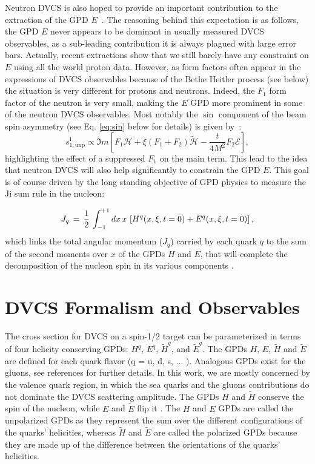 Neutron DVCS is also hoped to provide an important contribution to the 
extraction of the GPD $E$~\cite{dHose:2016mda}. The reasoning behind this expectation is as 
follows, the GPD $E$ never appears to be dominant in usually measured DVCS 
observables, as a sub-leading contribution it is always plagued with large 
error bars. Actually, recent extractions \cite{Dupre:2017hfs,Moutarde:2018kwr} show 
that we still barely have any constraint on $E$ using all the world proton 
data.  However, as form factors often appear in the expressions of
DVCS observables because of the Bethe Heitler process (see below) the situation 
is very different for protons and neutrons. Indeed, the $F_1$ form factor of the 
neutron is very small, making the $E$ GPD more prominent in some of the neutron DVCS 
observables. Most notably the $\sin$ component of the beam spin asymmetry 
(see Eq. \ref{eq:sin} below for details) is given 
by~\cite{dHose:2016mda}:
\begin{equation}
s^\textrm{I}_{1,\textrm{unp}} \propto \Im m \left [ 
F_1 \mathcal{H} + \xi(F_1 + F_2) \mathcal{\tilde H} - \frac{t}{4M^2} F_2  \mathcal{E} \right ],
\end{equation}
highlighting the effect of a suppressed $F_1$ on the main term.
This lead to the idea that neutron DVCS will also help significantly to constrain the 
GPD $E$. This goal is of course driven by the long standing objective of GPD physics to
measure the Ji sum rule in the nucleon:

\begin{equation}
J_q \,=\, {1 \over 2} \, \int_{-1}^{+1} d x \, x \, 
\left[ H^{q}(x,\xi,t = 0) + E^{q}(x,\xi,t = 0) \right],
\label{eq:dvcs_spin}
\end{equation}
which links the total angular momentum ($J_q$) carried by each quark $q$ to the 
sum of the second moments over $x$ of the GPDs $H$ and $E$, that will complete 
the decomposition of the nucleon spin in its various components 
\cite{Ji:1996ek,Leader:2013jra}. 

\section{DVCS Formalism and Observables}

The cross section for DVCS on a spin-1/2 target can be parameterized in terms 
of four helicity conserving GPDs: $H^q$, $E^q$, $\tilde{H}^q$, and 
$\tilde{E}^q$. The GPDs $H$, $E$, $\widetilde{H}$ and $\widetilde{E}$ are 
defined for each quark flavor (q = u, d, s, ... ). Analogous GPDs exist for the 
gluons, see references \cite{PhysRevD.56.5524,Goeke:2001tz} for further 
details.  In this work, we are mostly concerned by the valence quark region, in 
which the sea quarks and the gluons contributions do not dominate the DVCS 
scattering amplitude. The GPDs $H$ and $\widetilde{H}$ conserve the spin of the 
nucleon, while $E$ and $\widetilde{E}$ flip it \cite{Diehl:2001pm}. The $H$ and 
$E$ GPDs are called the unpolarized GPDs as they represent the sum over the 
different configurations of the quarks' helicities, whereas $\widetilde{H}$ and 
$\widetilde{E}$ are called the polarized GPDs because they are made up of the 
difference between the orientations of the quarks' helicities.

